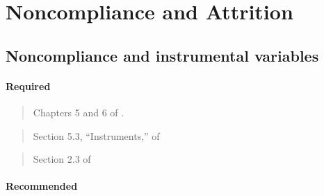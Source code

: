 \documentclass[12pt]{article}
\begin{document}

\begin{verse}  \end{verse}

\section{Noncompliance and Attrition}

\subsection{Noncompliance and instrumental variables}

\paragraph*{Required}

\begin{verse} Chapters 5 and 6 of . \end{verse}

\begin{verse}  \end{verse}

\begin{verse}
 \end{verse}

\begin{verse}
  Section 5.3, ``Instruments,'' of  \end{verse}

\begin{verse} Section 2.3 of  \end{verse}

\paragraph*{Recommended}

\begin{verse}  \end{verse}

\begin{verse}  \end{verse}

\begin{verse}  \end{verse}
\end{document}
